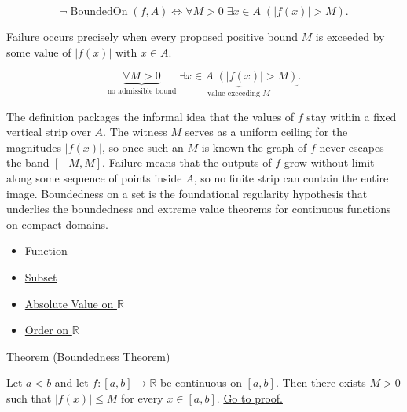 \begin{remark*}
\[
\neg \operatorname{BoundedOn}(f,A) \Longleftrightarrow \forall M>0 \; \exists x \in A \; (|f(x)| > M).
\]
\end{remark*}

\begin{remark*}
Failure occurs precisely when every proposed positive bound $M$ is exceeded by some value of $|f(x)|$ with $x \in A$.
\end{remark*}

\begin{remark*}
\[
\underbrace{\forall M>0}_{\text{no admissible bound}}
\; \underbrace{\exists x \in A \; (|f(x)| > M)}_{\text{value exceeding } M}.
\]
\end{remark*}





\begin{remark*}[Interpretation]
The definition packages the informal idea that the values of $f$ stay within a fixed vertical strip over $A$. The witness $M$ serves as a uniform ceiling for the magnitudes $|f(x)|$, so once such an $M$ is known the graph of $f$ never escapes the band $[-M,M]$. Failure means that the outputs of $f$ grow without limit along some sequence of points inside $A$, so no finite strip can contain the entire image. Boundedness on a set is the foundational regularity hypothesis that underlies the boundedness and extreme value theorems for continuous functions on compact domains.
\end{remark*}

\begin{dependencies}
\begin{itemize}
  \item \hyperref[def:function]{Function}
  \item \hyperref[def:subset]{Subset}
  \item \hyperref[def:real-chapter-absolute-value-on-r]{Absolute Value on $\mathbb{R}$}
  \item \hyperref[def:order-on-r]{Order on $\mathbb{R}$}
\end{itemize}
\end{dependencies}

\begin{theorembox}{Theorem (Boundedness Theorem)}
\begin{theorem}
\label{thm:boundedness-theorem}
Let $a<b$ and let $f:[a,b]\to\mathbb{R}$ be continuous on $[a,b]$. Then there exists $M>0$ such that $|f(x)|\le M$ for every $x\in[a,b]$.
\hyperref[prf:boundedness-theorem]{Go to proof.}
\end{theorem}
\end{theorembox}

